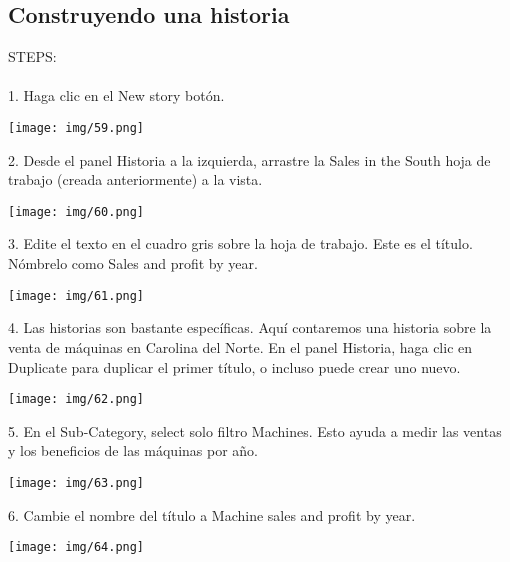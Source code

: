 \documentclass[12pt,letterpaper]{article}
\begin{document}
\subsection{Construyendo una historia}
STEPS:
\\\\1. Haga clic en el New story botón.
\begin{center}
    \texttt{[image: img/59.png]}  
\end{center}
2. Desde el panel Historia a la izquierda, arrastre la Sales in the South hoja de trabajo
(creada anteriormente) a la vista.
\begin{center}
    \texttt{[image: img/60.png]}  
\end{center}
3. Edite el texto en el cuadro gris sobre la hoja de trabajo. Este es el título. Nómbrelo como Sales
and profit by year.
\begin{center}
    \texttt{[image: img/61.png]}  
\end{center}
4. Las historias son bastante específicas. Aquí contaremos una historia sobre la venta de máquinas
en Carolina del Norte. En el panel Historia, haga clic en Duplicate para duplicar el primer
título, o incluso puede crear uno nuevo.
\begin{center}
    \texttt{[image: img/62.png]}  
\end{center}
5. En el Sub-Category, select solo filtro Machines. Esto ayuda a medir las ventas y los
beneficios de las máquinas por año.
\begin{center}
    \texttt{[image: img/63.png]}  
\end{center}
6. Cambie el nombre del título a Machine sales and profit by year.
\begin{center}
    \texttt{[image: img/64.png]}  
\end{center}
\end{document}
